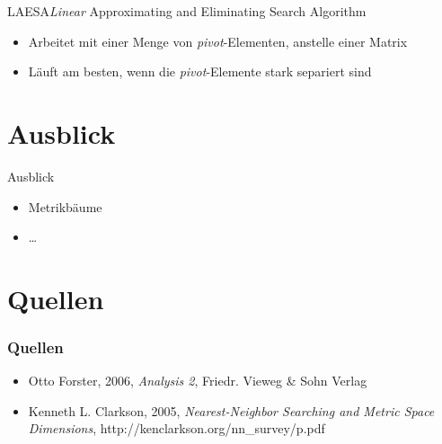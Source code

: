 \documentclass{beamer}
\begin{document}
\begin{frame}{LAESA}{\textit{Linear} Approximating and Eliminating Search Algorithm}
 \begin{itemize}
  \item Arbeitet mit einer Menge von \textit{pivot}-Elementen, anstelle einer Matrix
  \pause
  \item Läuft am besten, wenn die \textit{pivot}-Elemente stark separiert sind
 \end{itemize}
\end{frame}

\section{Ausblick}
\begin{frame}{Ausblick}
 \begin{itemize}
  \item Metrikbäume
  \item \dots
 \end{itemize}
\end{frame}

\section{Quellen}
\begin{frame}
 \frametitle{Quellen}
 \begin{itemize}
  \item Otto Forster, 2006, \textit{Analysis 2}, Friedr. Vieweg \& Sohn Verlag
  \item Kenneth L. Clarkson, 2005, \textit{Nearest-Neighbor Searching and Metric Space Dimensions}, http://kenclarkson.org/nn\_survey/p.pdf
  \end{itemize}
\end{frame}
\end{document}
